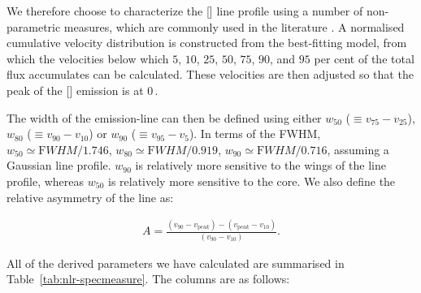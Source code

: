 We therefore choose to characterize the [] line profile using a number of non-parametric measures, which are commonly used in the literature \citep[e.g.][]{zakamska14,zakamska16}. 
A normalised cumulative velocity distribution is constructed from the best-fitting model, from which the velocities below which $5$, $10$, $25$, $50$, $75$, $90$, and $95$ per cent of the total flux accumulates can be calculated. 
These velocities are then adjusted so that the peak of the [] emission is at 0\,\kms. 

The width of the emission-line can then be defined using either $w_{50}$ ($\equiv v_{75} - v_{25}$), $w_{80}$ ($\equiv v_{90} - v_{10}$) or $w_{90}$ ($\equiv v_{95} - v_{5}$). 
In terms of the FWHM, $w_{50} \simeq {\mathrm FWHM} / 1.746$, $w_{80} \simeq {\mathrm FWHM} / 0.919$, $w_{90} \simeq {\mathrm FWHM} / 0.716$, assuming a Gaussian line profile.  
$w_{90}$ is relatively more sensitive to the wings of the line profile, whereas $w_{50}$ is relatively more sensitive to the core.
We also define the relative asymmetry of the line as:

\begingroup\makeatletter{}\check@mathfonts
\begin{eqnarray}
  A = \frac{(v_{90} - v_{\mathrm peak}) - (v_{\mathrm peak} - v_{10})}{(v_{90} - v_{10})}.     
\end{eqnarray} 
\endgroup

\noindent All of the derived parameters we have calculated are summarised in Table~\ref{tab:nlr-specmeasure}. 
The columns are as follows: 

